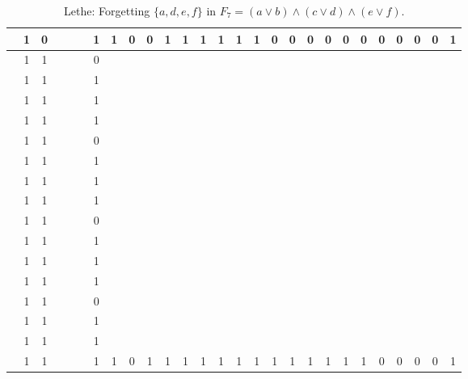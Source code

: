 \begin{table}[!tb]
\begin{tabular}{|c|c|c|c|c|c|c|c|c|c|c|c|c|c|c|c|c|c|c|c|c|c|c|c|c|c|c|}
        \rowcolor{red!40}  & 1 & 0 &  &  &  & 1 & 1 & 0 & 0 & 1 & 1 & 1 & 1 & 1 & 1 & 0 & 0 & 0 & 0 & 0 & 0 & 0 & 0 & 0 & 0 & 1 \\ \hline
        \rowcolor{green!40}  & 1 & 1 &  &  &  & 0 &  &  &  &  &  &  &  &  &  &  &  &  &  &  &  &  &  &  &  &  \\ \hline
        \rowcolor{green!40}  & 1 & 1 &  &  &  & 1 &  &  &  &  &  &  &  &  &  &  &  &  &  &  &  &  &  &  &  &  \\ \hline
        \rowcolor{green!40}  & 1 & 1 &  &  &  & 1 &  &  &  &  &  &  &  &  &  &  &  &  &  &  &  &  &  &  &  &  \\ \hline
        \rowcolor{green!40}  & 1 & 1 &  &  &  & 1 &  &  &  &  &  &  &  &  &  &  &  &  &  &  &  &  &  &  &  &  \\ \hline
        \rowcolor{green!40}  & 1 & 1 &  &  &  & 0 &  &  &  &  &  &  &  &  &  &  &  &  &  &  &  &  &  &  &  &  \\ \hline
        \rowcolor{green!40}  & 1 & 1 &  &  &  & 1 &  &  &  &  &  &  &  &  &  &  &  &  &  &  &  &  &  &  &  &  \\ \hline
        \rowcolor{green!40}  & 1 & 1 &  &  &  & 1 &  &  &  &  &  &  &  &  &  &  &  &  &  &  &  &  &  &  &  &  \\ \hline
        \rowcolor{green!40}  & 1 & 1 &  &  &  & 1 &  &  &  &  &  &  &  &  &  &  &  &  &  &  &  &  &  &  &  &  \\ \hline
        \rowcolor{green!40}  & 1 & 1 &  &  &  & 0 &  &  &  &  &  &  &  &  &  &  &  &  &  &  &  &  &  &  &  &  \\ \hline
        \rowcolor{green!40}  & 1 & 1 &  &  &  & 1 &  &  &  &  &  &  &  &  &  &  &  &  &  &  &  &  &  &  &  &  \\ \hline
        \rowcolor{green!40}  & 1 & 1 &  &  &  & 1 &  &  &  &  &  &  &  &  &  &  &  &  &  &  &  &  &  &  &  &  \\ \hline
        \rowcolor{green!40}  & 1 & 1 &  &  &  & 1 &  &  &  &  &  &  &  &  &  &  &  &  &  &  &  &  &  &  &  &  \\ \hline
        \rowcolor{green!40}  & 1 & 1 &  &  &  & 0 &  &  &  &  &  &  &  &  &  &  &  &  &  &  &  &  &  &  &  &  \\ \hline
        \rowcolor{green!40}  & 1 & 1 &  &  &  & 1 &  &  &  &  &  &  &  &  &  &  &  &  &  &  &  &  &  &  &  &  \\ \hline
        \rowcolor{green!40}  & 1 & 1 &  &  &  & 1 &  &  &  &  &  &  &  &  &  &  &  &  &  &  &  &  &  &  &  &  \\ \hline
        \rowcolor{green!40}  & 1 & 1 &  &  &  & 1 & 1 & 0 & 1 & 1 & 1 & 1 & 1 & 1 & 1 & 1 & 1 & 1 & 1 & 1 & 1 & 0 & 0 & 0 & 0 & 1 \\ \hline
    \end{tabular}
    \caption{Lethe: Forgetting $\{a, d, e, f\}$ in $F_{7} = (a \lor b) \land (c \lor d) \land (e \lor f)$.}
    \label{tab:lethe-F7-adef}
\end{table}
